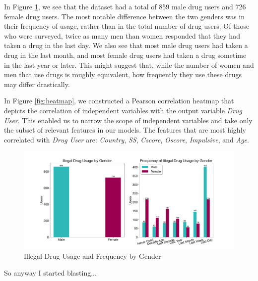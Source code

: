 \documentclass[10pt]{article}
\begin{document}
In Figure \ref{fig:genders}, we see that the dataset had a total of 859 male drug users and 726 female drug users. The most notable difference between the two genders was in their frequency of usage, rather than in the total number of drug users. Of those who were surveyed, twice as many men than women responded that they had taken a drug in the last day. We also see that most male drug users had taken a drug in the last month, and most female drug users had taken a drug sometime in the last year or later. This might suggest that, while the number of women and men that use drugs is roughly equivalent, how frequently they use these drugs may differ drastically.

In Figure \ref{fig:heatmap}, we constructed a Pearson correlation heatmap that depicts the correlation of independent variables with the output variable \textit{Drug User}. This enabled us to narrow the scope of independent variables and take only the subset of relevant features in our models. The features that are most highly correlated with \textit{Drug User} are: \textit{Country}, \textit{SS}, \textit{Cscore}, \textit{Oscore}, \textit{Impulsive}, and \textit{Age}.

\begin{figure}[H]
\caption{Illegal Drug Usage and Frequency by Gender}
\label{fig:genders}
\centering
\includegraphics[scale=0.4]{gender_freq.png}
\end{figure}

So anyway I started blasting...
\end{document}
